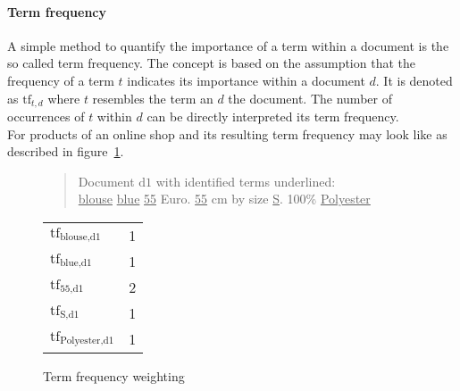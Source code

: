 \paragraph{Term frequency}
\label{sec:tf}
A simple method to quantify the importance of a term within a document is the so called term frequency.
The concept is based on the assumption that the frequency of a term $t$ indicates its importance within a document $d$.
It is denoted as $\text{tf}_{t,d}$ where $t$ resembles the term an $d$ the document.
The number of occurrences of $t$ within $d$ can be directly interpreted its term frequency.\citep[p.~117]{manning:2009}\\
For products of an online shop and its resulting term frequency may look like as described in figure~\ref{fig:tfweighting}.\\
\begin{figure}[h]

    \begin{quote}
        Document $\text{d}1$ with identified terms underlined:\\
        \underline{blouse} \underline{blue} \underline{55} Euro. \underline{55} cm by size \underline{S}. 100\% \underline{Polyester}
    \end{quote}

    \center
    \vspace{5mm}
    \begin{tabular}{ l l }
        \rowcolor{\dustRowHead}
        \multicolumn{2}{c}{Term frequency}\\\hline
        $\text{tf}_{\text{blouse},\text{d1}}$       & 1\\
        $\text{tf}_{\text{blue},\text{d1}}$         & 1\\
        $\text{tf}_{\text{55},\text{d1}}$           & 2\\
        $\text{tf}_{\text{S},\text{d1}}$            & 1\\
        $\text{tf}_{\text{Polyester},\text{d1}}$    & 1\\
    \end{tabular}

    \caption{Term frequency weighting}
    \label{fig:tfweighting}
\end{figure}

